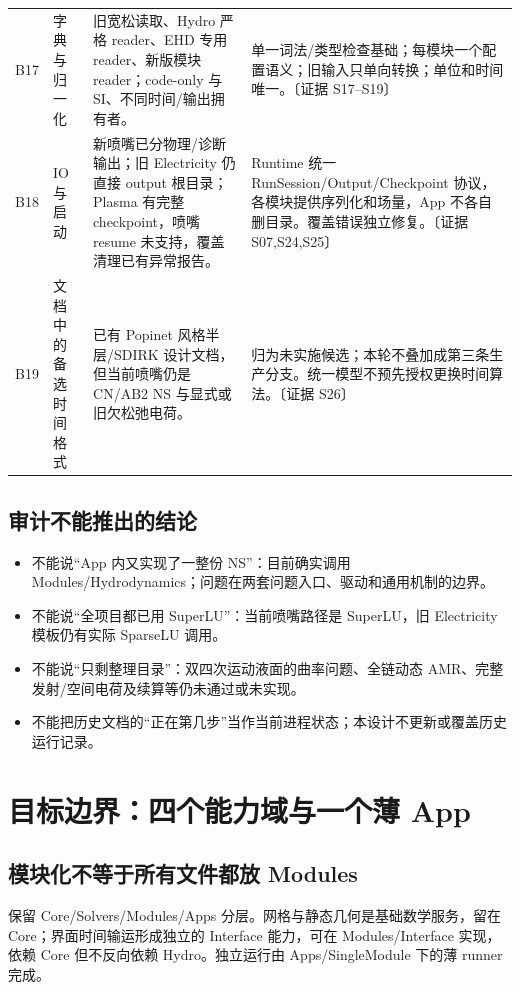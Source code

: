\documentclass[UTF8,a4paper,11pt,fontset=fandol]{ctexart}
\numberwithin{equation}{section}
\newcommand{\ev}[1]{\textcolor{accent}{〔证据 #1〕}}
\begin{document}
\begin{longtable}{@{}P{.06\textwidth}P{.23\textwidth}P{.33\textwidth}P{.30\textwidth}@{}}
B17 & 字典与归一化 & 旧宽松读取、Hydro 严格 reader、EHD 专用 reader、新版模块 reader；code-only 与 SI、不同时间/输出拥有者。 & 单一词法/类型检查基础；每模块一个配置语义；旧输入只单向转换；单位和时间唯一。\ev{S17--S19}\\
B18 & IO 与启动 & 新喷嘴已分物理/诊断输出；旧 Electricity 仍直接 output 根目录；Plasma 有完整 checkpoint，喷嘴 resume 未支持，覆盖清理已有异常报告。 & Runtime 统一 RunSession/Output/Checkpoint 协议，各模块提供序列化和场量，App 不各自删目录。覆盖错误独立修复。\ev{S07,S24,S25}\\
B19 & 文档中的备选时间格式 & 已有 Popinet 风格半层/SDIRK 设计文档，但当前喷嘴仍是 CN/AB2 NS 与显式或旧欠松弛电荷。 & 归为未实施候选；本轮不叠加成第三条生产分支。统一模型不预先授权更换时间算法。\ev{S26}\\
\bottomrule
\end{longtable}
\normalsize

\subsection{审计不能推出的结论}
\begin{itemize}
\item 不能说“App 内又实现了一整份 NS”：目前确实调用 Modules/Hydrodynamics；问题在两套问题入口、驱动和通用机制的边界。
\item 不能说“全项目都已用 SuperLU”：当前喷嘴路径是 SuperLU，旧 Electricity 模板仍有实际 SparseLU 调用。
\item 不能说“只剩整理目录”：双四次运动液面的曲率问题、全链动态 AMR、完整发射/空间电荷及续算等仍未通过或未实现。
\item 不能把历史文档的“正在第几步”当作当前进程状态；本设计不更新或覆盖历史运行记录。
\end{itemize}

\section{目标边界：四个能力域与一个薄 App}\label{sec:target}
\subsection{模块化不等于所有文件都放 Modules}
保留 Core/Solvers/Modules/Apps 分层。网格与静态几何是基础数学服务，留在 Core；界面时间输运形成独立的 Interface 能力，可在 Modules/Interface 实现，依赖 Core 但不反向依赖 Hydro。独立运行由 Apps/SingleModule 下的薄 runner 完成。
\end{document}
